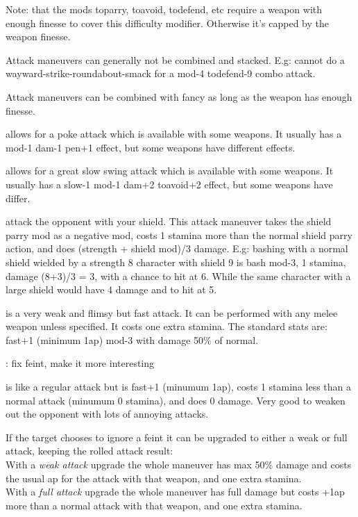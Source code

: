 Note: that the mods toparry, toavoid, todefend, etc require a weapon with enough finesse to cover this difficulty modifier. Otherwise it's capped by the weapon finesse.

Attack maneuvers can generally not be combined and stacked. E.g: cannot do a wayward-strike-roundabout-smack for a mod-4 todefend-9 combo attack.

Attack maneuvers can be combined with fancy as long as the weapon has enough finesse.


\openskillslist


 allows for a poke attack which is available with some weapons. It usually has a mod-1 dam-1 pen+1 effect, but some weapons have different effects.


 allows for a great slow swing attack which is available with some weapons. It usually has a slow-1 mod-1 dam+2 toavoid+2 effect, but some weapons have differ.


 attack the opponent with your shield. This attack maneuver takes the shield parry mod as a negative mod, costs 1 stamina more than the normal shield parry action, and does (strength + shield mod)/3 damage. E.g: bashing with a normal shield wielded by a strength 8 character with shield 9 is bash mod-3, 1 stamina, damage (8+3)/3 = 3, with a chance to hit at 6. While the same character with a large shield would have 4 damage and to hit at 5.


 is a very weak and flimsy but fast attack. It can be performed with any melee weapon unless specified. It costs one extra stamina. The standard stats are:\\
fast+1 (minimum 1ap) mod-3 with damage 50\% of normal.


\TODO: fix feint, make it more interesting

 is like a regular attack but is fast+1 (minumum 1ap), costs 1 stamina less than a normal attack (minumum 0 stamina), and does 0 damage. Very good to weaken out the opponent with lots of annoying attacks.

If the target chooses to ignore a feint it can be upgraded to either a weak or full attack, keeping the rolled attack result:\\
With a \emph{weak attack} upgrade the whole maneuver has max 50\% damage and costs the usual ap for the attack with that weapon, and one extra stamina.\\
With a \emph{full attack} upgrade the whole maneuver has full damage but costs +1ap more than a normal attack with that weapon, and one extra stamina.


